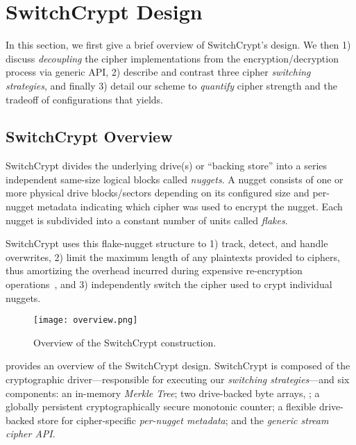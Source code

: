 \section{SwitchCrypt Design}\label{sec:design}

In this section, we first give a brief overview of SwitchCrypt's design. We then
1) discuss \emph{decoupling} the cipher implementations from the
encryption/decryption process via generic API, 2) describe and contrast three
cipher \emph{switching strategies}, and finally 3) detail our scheme to
\emph{quantify} cipher strength and the tradeoff of configurations that yields.

\subsection{SwitchCrypt Overview}

SwitchCrypt divides the underlying drive(s) or ``backing store'' into a series
independent same-size logical blocks called \emph{nuggets}. A nugget consists of
one or more physical drive blocks/sectors depending on its configured size and
per-nugget metadata indicating which cipher was used to encrypt the nugget. Each
nugget is subdivided into a constant number of units called \emph{flakes}.

SwitchCrypt uses this flake-nugget structure to 1) track, detect, and handle
overwrites, 2) limit the maximum length of any plaintexts provided to ciphers,
thus amortizing the overhead incurred during expensive re-encryption
operations~\cite{StrongBox}, and 3) independently switch the cipher used to
crypt individual nuggets.


\begin{figure}[ht]
   \centering
   \texttt{[image: overview.png]}
   \caption{Overview of the SwitchCrypt construction.}\label{fig:overview}
\end{figure}

 provides an overview of the SwitchCrypt design. SwitchCrypt is
composed of the cryptographic driver---responsible for executing our
\emph{switching strategies}---and six components: an in-memory \emph{Merkle
Tree}; two drive-backed byte arrays, ; a globally persistent cryptographically secure
monotonic counter; a flexible drive-backed store for cipher-specific
\emph{per-nugget metadata}; and the \emph{generic stream cipher API}.

